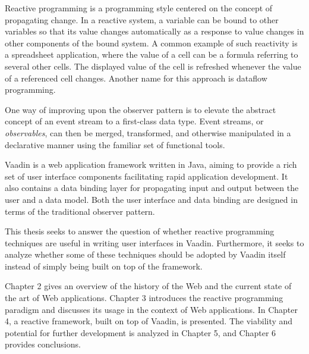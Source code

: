 Reactive programming is a programming style centered on the concept of propagating change. In a reactive system, a variable can be bound to other variables so that its value changes automatically as a response to value changes in other components of the bound system. A common example of such reactivity is a spreadsheet application, where the value of a cell can be a formula referring to several other cells. The displayed value of the cell is refreshed whenever the value of a referenced cell changes. Another name for this approach is dataflow programming.

One way of improving upon the observer pattern is to elevate the abstract concept of an event stream to a first-class data type. Event streams, or \emph{observables}, can then be merged, transformed, and otherwise manipulated in a declarative manner using the familiar set of functional tools.

Vaadin is a web application framework written in Java, aiming to provide a rich set of user interface components facilitating rapid application development. It also contains a data binding layer for propagating input and output between the user and a data model. Both the user interface and data binding are designed in terms of the traditional observer pattern. 

This thesis seeks to answer the question of whether reactive programming techniques are useful in writing user interfaces in Vaadin. Furthermore, it seeks to analyze whether some of these techniques should be adopted by Vaadin itself instead of simply being built on top of the framework.

Chapter 2 gives an overview of the history of the Web and the current state of the art of Web applications. Chapter 3 introduces the reactive programming paradigm and discusses its usage in the context of Web applications. In Chapter 4, a reactive framework, built on top of Vaadin, is presented. The viability and potential for further development is analyzed in Chapter 5, and Chapter 6 provides conclusions.